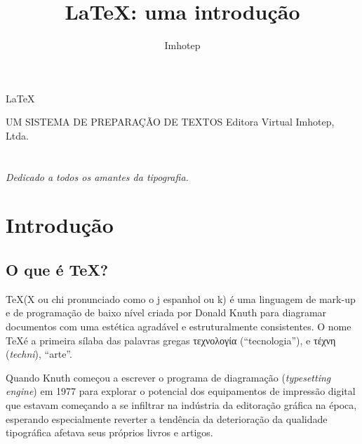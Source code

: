 \documentclass[a4paper,nols,bidi,nohyper]{tufte-book}
\title{LaTeX: uma introdução}
\author{Imhotep}
\begin{document}

\frenchspacing


\begin{titlepage}
\phantom{xxx}
\vfill
\centering
\fontsize{70}{80}\selectfont\LaTeX\par
\vspace{2cm}
\centering
\LARGE
UM SISTEMA DE PREPARAÇÃO DE TEXTOS
\vfill
\LARGE
Editora Virtual Imhotep, Ltda.
\end{titlepage}

\restoregeometry


\chapter*{}
\thispagestyle{empty}
\phantom{}
\vfill
{\large \emph{Dedicado a todos os amantes da tipografia.}}
\vfill
\cleardoublepage

\tableofcontents

\listoffigures

\listoftables

\chapter{Introdução}

\section{O que é TeX?}
\TeX (X ou chi pronunciado como o j espanhol ou k) é uma linguagem de mark-up e de programação de baixo nível criada por Donald Knuth para diagramar documentos com uma estética agradável e estruturalmente consistentes. O nome \TeX é a primeira sílaba das palavras gregas \textgreek{τεχνολογία} (``tecnologia''), e \textgreek{τέχνη} (\textit{techni}), ``arte''.
	
Quando Knuth começou a escrever o programa de diagramação (\textit{typesetting engine}) em 1977 para explorar o potencial dos equipamentos de impressão digital que estavam começando a se infiltrar na indústria da editoração gráfica na época, esperando especialmente reverter a tendência da deterioração da qualidade tipográfica afetava seus próprios livros e artigos.
\end{document}
